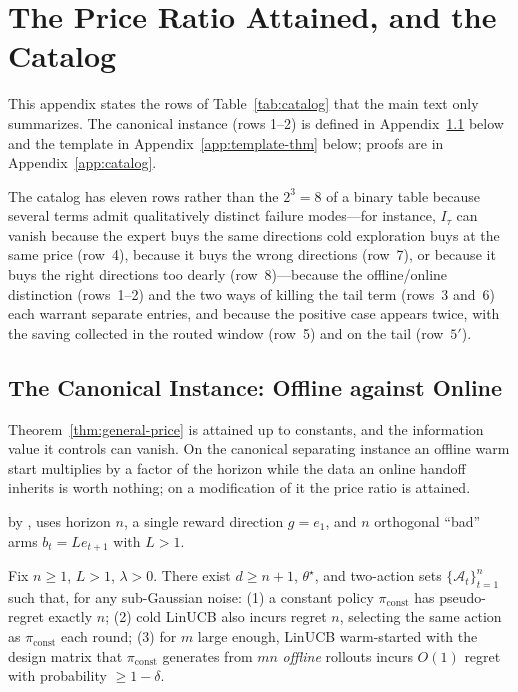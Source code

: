 \documentclass[anon]{alt2027} %
\begin{document}
\section{The Price Ratio Attained, and the Catalog}
\label{app:catalog-statements}

This appendix states the rows of Table~\ref{tab:catalog} that the main text
only summarizes. The canonical instance (rows 1--2) is defined in
Appendix~\ref{sec:catalog} below and the template in Appendix~\ref{app:template-thm}
below; proofs are in Appendix~\ref{app:catalog}.

The catalog has eleven rows rather than the $2^3=8$ of a binary table
because several terms admit qualitatively distinct failure modes---for
instance, $I_\tau$ can vanish because the expert buys the same directions cold
exploration buys at the same price (row~4), because it buys the wrong
directions (row~7), or because it buys the right directions too dearly
(row~8)---because the offline/online distinction (rows~1--2) and the two
ways of killing the tail term (rows~3 and~6) each warrant separate entries,
and because the positive case appears twice, with the saving collected in
the routed window (row~5) and on the tail (row~$5'$).

\subsection{The Canonical Instance: Offline against Online}
\label{sec:catalog}
\label{sec:canonical}

Theorem~\ref{thm:general-price} is attained up to constants, and the
information value it controls can vanish. On the canonical separating
instance an offline warm start multiplies by a factor of the horizon while the
data an online handoff inherits is worth nothing; on a modification of it the
price ratio is attained.

by \citet{chen2024llmdecision}, uses
horizon $n$, a single reward direction $g=e_1$, and $n$ orthogonal ``bad''
arms $b_t=Le_{t+1}$ with $L>1$.

\begin{proposition}
\label{prop:three-way}
Fix $n\ge1$, $L>1$, $\lambda>0$. There exist $d\ge n+1$, $\theta^\star$, and
two-action sets $\{\mathcal A_t\}_{t=1}^n$ such that, for any sub-Gaussian
noise: (1) a constant policy $\pi_{\mathrm{const}}$ has pseudo-regret exactly
$n$; (2) cold LinUCB also incurs regret $n$, selecting the same action as
$\pi_{\mathrm{const}}$ each round; (3) for $m$ large enough, LinUCB
warm-started with the design matrix that $\pi_{\mathrm{const}}$ generates from
$mn$ \emph{offline} rollouts incurs $O(1)$ regret with probability $\ge1-\delta$.
\end{proposition}
\end{document}
